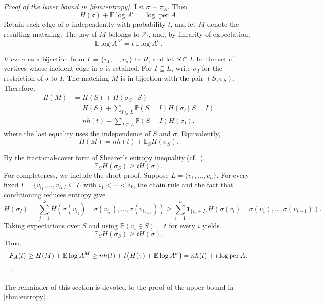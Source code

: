 \documentclass[11pt,reqno,letterpaper]{amsart}
\numberwithin{equation}{section}
\theoremstyle{definition}
\theoremstyle{remark}
\newcommand{\E}{\mathbb E}
\newcommand{\PP}{\mathbb P}
\newcommand{\one}{\mathbf 1}
\DeclareMathOperator{\per}{per}
\begin{document}
\begin{proof}[Proof of the lower bound in \cref{thm:entropy}]
Let $\sigma\sim\pi_A$. Then
\[
  H(\sigma)+\E\log A^\sigma=\log\per A.
\]
Retain each edge of $\sigma$ independently with probability $t$, and
let $M$ denote the resulting matching. The law of $M$ belongs to
$\mathcal V_t$, and, by linearity of expectation,
\[
  \E\log A^M=t\,\E\log A^\sigma.
\]

View $\sigma$ as a bijection from
$L=\{v_1,\ldots,v_n\}$ to $R$, and let $S\subseteq L$ be the set of
vertices whose incident edge in $\sigma$ is retained. For
$I\subseteq L$, write $\sigma_I$ for the restriction of $\sigma$ to
$I$. The matching $M$ is in bijection with the pair $(S,\sigma_S)$.
Therefore,
\begin{align*}
  H(M)
  &=H(S)+H(\sigma_S\mid S)\\
  &=H(S)+\sum_{I\subseteq L}
    \PP(S=I)H(\sigma_I\mid S=I)\\
  &=nh(t)+\sum_{I\subseteq L}
    \PP(S=I)H(\sigma_I),
\end{align*}
where the last equality uses the independence of $S$ and $\sigma$.
Equivalently,
\[
  H(M)=nh(t)+\E_S H(\sigma_S).
\]

By the fractional-cover form of Shearer's entropy inequality (cf.~\cite{MadimanTetali}),
\[
  \E_S H(\sigma_S)\geq tH(\sigma).
\]
For completeness, we include the short proof. Suppose $L=\{v_1,\dots,v_n\}$. For every fixed
$I=\{v_{i_1},\dots,v_{i_k}\}\subseteq L$ with $i_1<\cdots<i_k$, the chain rule and the fact that conditioning reduces
entropy give
\[
  H(\sigma_I)=\sum_{j=1}^kH\!\left(
    \sigma(v_{i_j})
    \,\middle|\,
    \sigma(v_{i_1}),\ldots,\sigma(v_{i_{j-1}})
  \right)
  \geq
  \sum_{i=1}^n
  \one_{\{v_i\in I\}}
  H\!\left(
    \sigma(v_i)
    \,\middle|\,
    \sigma(v_1),\ldots,\sigma(v_{i-1})
  \right).
\]
Taking expectations over $S$ and using
$\PP(v_i\in S)=t$ for every $i$ yields
\[
  \E_S H(\sigma_S)\geq tH(\sigma).
\]
Thus,
\[
  F_A(t)
  \geq H(M)+\E\log A^M
  \geq nh(t)+t\bigl(H(\sigma)+\E\log A^\sigma\bigr)
  =nh(t)+t\log\per A.
  \qedhere
\]
\end{proof}

The remainder of this section is devoted to the proof of the upper bound in \cref{thm:entropy}.

\medskip
\end{document}
